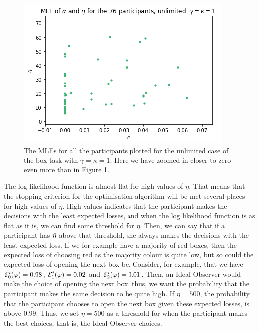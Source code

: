 \begin{figure}
    \centering
    \includegraphics[scale=0.7]{pictures/plotted_mles_unlim_gk1_zoom2.png}
    \caption[MLEs of $\alpha$ and $\eta$, unlimited with $\gamma=\kappa=1$, zoomed more]{The MLEs for all the participants plotted for the unlimited case of the box task with $\gamma=\kappa=1$. Here we have zoomed in closer to zero even more than in Figure \ref{fig:plot_all_mles_unlim_zoom2}.}
    \label{fig:plot_all_mles_unlim_zoom2}
\end{figure}

The log likelihood function is almost flat for high values of $\eta$. That means that the stopping criterion for the optimisation algorithm will be met several places for high values of $\eta$. High values indicates that the participant makes the decisions with the least expected losses,  and when the log likelihood function is as flat as it is, we can find some threshold for $\eta$. Then, we can say that if a participant has $\hat{\eta}$ above that threshold, she always makes the decisions with the least expected loss. If we for example have a majority of red boxes, then the expected loss of choosing red as the majority colour is quite low, but so could the expected loss of opening the next box be. Consider, for example, that we have $\mathcal{E}_0^i(\varphi)=0.98$, $\mathcal{E}_1^i(\varphi)=0.02$ and $\mathcal{E}_2^i(\varphi)=0.01$. Then, an Ideal Observer would make the choice of opening the next box, thus, we want the probability that the participant makes the same decision to be quite high. If $\eta=500$, the probability that the participant chooses to open the next box given these expected losses, is above $0.99$. Thus, we set $\eta=500$ as a threshold for when the participant makes the best choices, that is, the Ideal Observer choices. 
 
